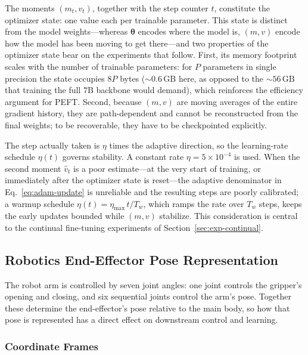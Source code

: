 \documentclass[english,12pt,a4paper,pdftex,elec,utf8]{aaltothesis}
\newcommand{\vhat}{\hat{v}}
\begin{document}
The moments $(m_t, v_t)$, together with the step counter $t$, constitute the optimizer state: one value each per trainable parameter. This state is distinct from the model weights---whereas $\boldsymbol{\theta}$ encodes where the model is, $(m,v)$ encode how the model has been moving to get there---and two properties of the optimizer state bear on the experiments that follow. First, its memory footprint scales with the number of trainable parameters: for $P$ parameters in single precision the state occupies $8P$ bytes ($\sim\!0.6\,\text{GB}$ here, as opposed to the $\sim\!56\,\text{GB}$ that training the full $7\text{B}$ backbone would demand), which reinforces the efficiency argument for PEFT. Second, because $(m,v)$ are moving averages of the entire gradient history, they are path-dependent and cannot be reconstructed from the final weights; to be recoverable, they have to be checkpointed explicitly.

The step actually taken is $\eta$ times the adaptive direction, so the learning-rate schedule $\eta(t)$ governs stability. A constant rate $\eta = 5\times 10^{-4}$ is used. When the second moment $\vhat_t$ is a poor estimate---at the very start of training, or immediately after the optimizer state is reset---the adaptive denominator in Eq.~\eqref{eq:adam-update} is unreliable and the resulting steps are poorly calibrated; a warmup schedule $\eta(t) = \eta_{\max}\, t / T_w$, which ramps the rate over $T_w$ steps, keeps the early updates bounded while $(m,v)$ stabilize. This consideration is central to the continual fine-tuning experiments of Section~\ref{sec:exp-continual}.

\subsection{Robotics End-Effector Pose Representation}
\label{sec:pose-representation}
The robot arm is controlled by seven joint angles: one joint controls the gripper's opening and closing, and six sequential joints control the arm's pose. Together these determine the end-effector's pose relative to the main body, so how that pose is represented has a direct effect on downstream control and learning.

\subsubsection{Coordinate Frames}
\end{document}
